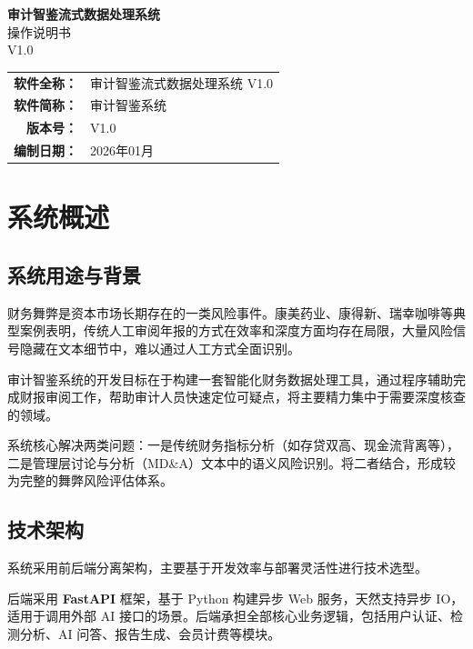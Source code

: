 \documentclass[12pt,a4paper]{ctexart}
\begin{document}
\begin{titlepage}
\centering
\vspace*{3cm}
{\Huge\heiti\bfseries 审计智鉴流式数据处理系统}\\[0.8cm]
{\LARGE\heiti 操作说明书}\\[0.5cm]
{\Large V1.0}\\[3cm]
\begin{tabular}{rl}
\textbf{软件全称：} & 审计智鉴流式数据处理系统 V1.0 \\[0.3em]
\textbf{软件简称：} & 审计智鉴系统 \\[0.3em]
\textbf{版本号：} & V1.0 \\[0.3em]
\textbf{编制日期：} & 2026年01月 \\
\end{tabular}
\vfill
\end{titlepage}

\tableofcontents
\newpage

\section{系统概述}

\subsection{系统用途与背景}

财务舞弊是资本市场长期存在的一类风险事件。康美药业、康得新、瑞幸咖啡等典型案例表明，传统人工审阅年报的方式在效率和深度方面均存在局限，大量风险信号隐藏在文本细节中，难以通过人工方式全面识别。

审计智鉴系统的开发目标在于构建一套智能化财务数据处理工具，通过程序辅助完成财报审阅工作，帮助审计人员快速定位可疑点，将主要精力集中于需要深度核查的领域。

系统核心解决两类问题：一是传统财务指标分析（如存贷双高、现金流背离等），二是管理层讨论与分析（MD\&A）文本中的语义风险识别。将二者结合，形成较为完整的舞弊风险评估体系。

\subsection{技术架构}

系统采用前后端分离架构，主要基于开发效率与部署灵活性进行技术选型。

后端采用 \textbf{FastAPI} 框架，基于 Python 构建异步 Web 服务，天然支持异步 IO，适用于调用外部 AI 接口的场景。后端承担全部核心业务逻辑，包括用户认证、检测分析、AI 问答、报告生成、会员计费等模块。
\end{document}
